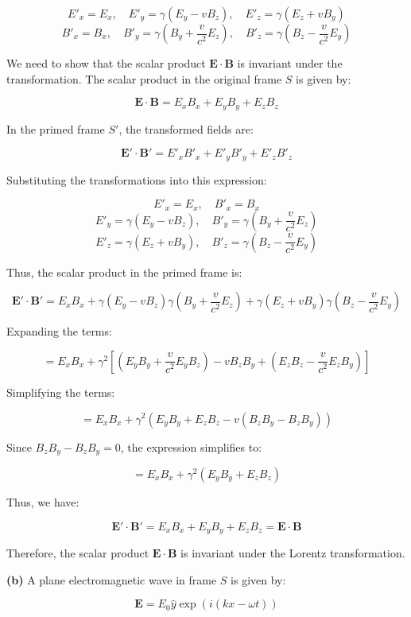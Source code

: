\documentclass{article}
\begin{document}
\[
E'_x = E_x, \quad E'_y = \gamma (E_y - v B_z), \quad E'_z = \gamma (E_z + v B_y)
\]
\[
B'_x = B_x, \quad B'_y = \gamma \left( B_y + \frac{v}{c^2} E_z \right), \quad B'_z = \gamma \left( B_z - \frac{v}{c^2} E_y \right)
\]

We need to show that the scalar product \( \mathbf{E} \cdot \mathbf{B} \) is invariant under the transformation. The scalar product in the original frame \( S \) is given by:

\[
\mathbf{E} \cdot \mathbf{B} = E_x B_x + E_y B_y + E_z B_z
\]

In the primed frame \( S' \), the transformed fields are:

\[
\mathbf{E}' \cdot \mathbf{B}' = E'_x B'_x + E'_y B'_y + E'_z B'_z
\]

Substituting the transformations into this expression:

\[
E'_x = E_x, \quad B'_x = B_x
\]
\[
E'_y = \gamma (E_y - v B_z), \quad B'_y = \gamma \left( B_y + \frac{v}{c^2} E_z \right)
\]
\[
E'_z = \gamma (E_z + v B_y), \quad B'_z = \gamma \left( B_z - \frac{v}{c^2} E_y \right)
\]

Thus, the scalar product in the primed frame is:

\[
\mathbf{E}' \cdot \mathbf{B}' = E_x B_x + \gamma (E_y - v B_z) \gamma \left( B_y + \frac{v}{c^2} E_z \right) + \gamma (E_z + v B_y) \gamma \left( B_z - \frac{v}{c^2} E_y \right)
\]

Expanding the terms:

\[
= E_x B_x + \gamma^2 \left[ (E_y B_y + \frac{v}{c^2} E_y B_z) - v B_z B_y + (E_z B_z - \frac{v}{c^2} E_z B_y) \right]
\]

Simplifying the terms:

\[
= E_x B_x + \gamma^2 \left( E_y B_y + E_z B_z - v (B_z B_y - B_z B_y) \right)
\]

Since \( B_z B_y - B_z B_y = 0 \), the expression simplifies to:

\[
= E_x B_x + \gamma^2 \left( E_y B_y + E_z B_z \right)
\]

Thus, we have:

\[
\mathbf{E}' \cdot \mathbf{B}' = E_x B_x + E_y B_y + E_z B_z = \mathbf{E} \cdot \mathbf{B}
\]

Therefore, the scalar product \( \mathbf{E} \cdot \mathbf{B} \) is invariant under the Lorentz transformation.

\textbf{(b)} A plane electromagnetic wave in frame \( S \) is given by:

\[
\mathbf{E} = E_0 \hat{y} \exp \left( i (k x - \omega t) \right)
\]
\end{document}
